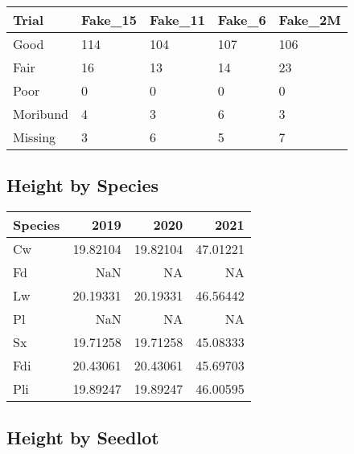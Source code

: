 \documentclass[
]{article}
\begin{document}
\begin{tabular}{l|l|l|l|l}
\hline
Trial & Fake\_15 & Fake\_11 & Fake\_6 & Fake\_2M\\
\hline
Good & 114 & 104 & 107 & 106\\
\hline
Fair & 16 & 13 & 14 & 23\\
\hline
Poor & 0 & 0 & 0 & 0\\
\hline
Moribund & 4 & 3 & 6 & 3\\
\hline
Missing & 3 & 6 & 5 & 7\\
\hline
\end{tabular}

\hypertarget{height-by-species-1}{%
\subsection{Height by Species}\label{height-by-species-1}}

\begin{tabular}{l|r|r|r}
\hline
Species & 2019 & 2020 & 2021\\
\hline
Cw & 19.82104 & 19.82104 & 47.01221\\
\hline
Fd & NaN & NA & NA\\
\hline
Lw & 20.19331 & 20.19331 & 46.56442\\
\hline
Pl & NaN & NA & NA\\
\hline
Sx & 19.71258 & 19.71258 & 45.08333\\
\hline
Fdi & 20.43061 & 20.43061 & 45.69703\\
\hline
Pli & 19.89247 & 19.89247 & 46.00595\\
\hline
\end{tabular}

\hypertarget{height-by-seedlot-1}{%
\subsection{Height by Seedlot}\label{height-by-seedlot-1}}
\end{document}
